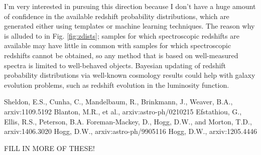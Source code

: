 \documentclass[12pt, onecolumn]{emulateapj}
\begin{document}
I'm very interested in pursuing this direction because I don't have a huge amount of confidence in the available redshift probability distributions, which are generated either using templates or machine learning techniques.  The reason why is alluded to in Fig. \ref{fig:zdists}; samples for which spectroscopic redshifts are available may have little in common with samples for which spectroscopic redshifts cannot be obtained, so any method that is based on well-measured spectra is limited to well-behaved objects.  Bayesian updating of redshift probability distributions via well-known cosmology results could help with galaxy evolution problems, such as redshift evolution in the luminosity function.



\begin{thebibliography}{}
Sheldon, E.S., Cunha, C., Mandelbaum, R., Brinkmann, J., Weaver, B.A., arxiv:1109.5192
Blanton, M.R., et al., arxiv:astro-ph/0210215
Efstathiou, G., Ellis, R.S., Peterson, B.A.
Foreman-Mackey, D., Hogg, D.W., and Morton, T.D., arxiv:1406.3020
Hogg, D.W., arxiv:astro-ph/9905116
Hogg, D.W., arxiv:1205.4446

FILL IN MORE OF THESE!
\end{thebibliography}
\end{document}
